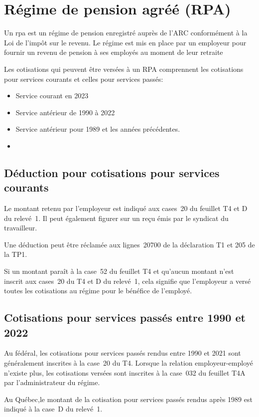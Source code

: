 \section{Régime de pension agréé (RPA)}
\begin{intro}
	Un \acrfull{rpa} est un régime de pension enregistré auprès de l'ARC conformément à la Loi de l'impôt sur le revenu. Le régime est mis en place par un employeur pour fournir un revenu de pension à ses employés au moment de leur retraite
\end{intro}
Les cotisations qui peuvent être versées à un RPA comprennent les cotisations pour services courants et celles pour services passés:
\begin{itemize}
	\item Service courant en 2023
	\item Service antérieur de 1990 à 2022
	\item Service antérieur pour 1989 et les années précédentes.
	\item 
\end{itemize}


\subsection{Déduction pour cotisations pour services courants}
Le montant retenu par l'employeur est indiqué aux cases~20 du feuillet T4 et D du relevé~1. Il peut également figurer sur un reçu émis par le syndicat du travailleur.

Une déduction peut être réclamée aux lignes~20700 de la déclaration T1 et 205 de la TP1.

Si un montant paraît à la case~52 du feuillet T4 et qu'aucun montant n'est inscrit aux cases~20 du T4 et D du relevé~1, cela signifie que l'employeur a versé toutes les cotisations au régime pour le bénéfice de l'employé.


\subsection{Cotisations pour services passés entre 1990 et 2022}
Au fédéral, les cotisations pour services passés rendus entre 1990 et 2021 sont généralement inscrites à la case~20 du T4. Lorsque la relation employeur-employé n'existe plus, les cotisations versées sont inscrites à la case~032 du feuillet T4A par l'administrateur du régime.

Au Québec,le montant de la cotisation pour services passés rendus après 1989 est indiqué à la case~D du relevé~1.

